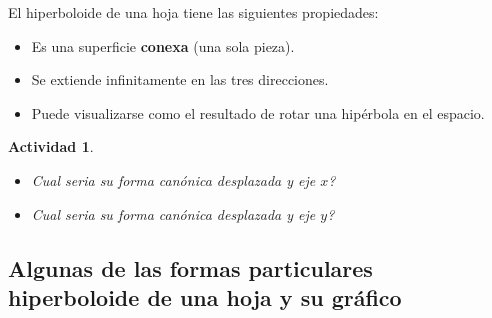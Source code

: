 \documentclass[11pt]{article}
\newtheorem{act}{Actividad}%
\begin{document}
El hiperboloide de una hoja tiene las siguientes propiedades:

\begin{itemize}
    \item Es una superficie \textbf{conexa} (una sola pieza).
    \item Se extiende infinitamente en las tres direcciones.
    \item Puede visualizarse como el resultado de rotar una hipérbola en el espacio.
\end{itemize}



\begin{act}
\begin{itemize}
    \item Cual seria su forma canónica desplazada y  eje $x$?
    \item Cual seria su forma canónica desplazada y  eje $y$? 
\end{itemize}
\end{act}




\subsection*{Algunas de las formas particulares  hiperboloide de una hoja y su gráfico}
\end{document}
